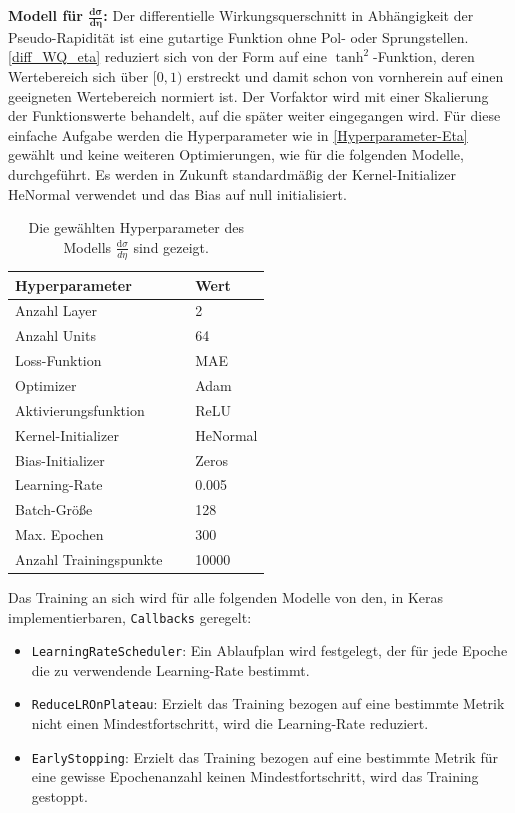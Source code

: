 \textbf{Modell für $\mathbf{\frac{d\sigma}{d\eta}}$:} 
Der differentielle Wirkungsquerschnitt in Abhängigkeit der Pseudo-Rapidität ist eine gutartige Funktion ohne Pol- oder Sprungstellen. \textsf{\autoref{diff_WQ_eta}} reduziert sich von der Form auf eine $\tanh^2$-Funktion, deren Wertebereich sich über $[0,1)$ erstreckt und damit schon von vornherein auf einen geeigneten Wertebereich normiert ist. Der Vorfaktor wird mit einer Skalierung der Funktionswerte behandelt, auf die später weiter eingegangen wird. 
Für diese einfache Aufgabe werden die Hyperparameter wie in \textsf{\autoref{Hyperparameter-Eta}} gewählt und keine weiteren Optimierungen, wie für die folgenden Modelle, durchgeführt. Es werden in Zukunft standardmäßig der Kernel-Initializer {HeNormal} verwendet und das Bias auf null initialisiert.
\begin{table}[hbt]
	\centering
	\caption{Die gewählten Hyperparameter des Modells $\frac{\text{d}\sigma}{d\eta}$ sind gezeigt.}
	\begin{tabular}{ll}
		Hyperparameter & Wert \\
		\hline \hline
		Anzahl Layer & 2 \\
		Anzahl Units & 64 \\
		Loss-Funktion & MAE \\
		Optimizer & Adam \\
		Aktivierungsfunktion & ReLU \\
		Kernel-Initializer & HeNormal \\
		Bias-Initializer & Zeros \\
		Learning-Rate & 0.005 \\
		Batch-Größe & 128 \\
		Max. Epochen & 300 \\
		Anzahl Trainingspunkte $\quad$& 10000\\
		\hline
	\end{tabular}
	\label{Hyperparameter-Eta}
\end{table}
Das Training an sich wird für alle folgenden Modelle von den, in Keras implementierbaren, \texttt{Callbacks} geregelt:
\begin{itemize}
	\setlength\itemsep{0cm}
	\setlength{\parskip}{0cm}
	\item \texttt{LearningRateScheduler}: Ein Ablaufplan wird festgelegt, der für jede Epoche die zu verwendende Learning-Rate bestimmt. 
	\item \texttt{ReduceLROnPlateau}: Erzielt das Training bezogen auf eine bestimmte Metrik nicht einen Mindestfortschritt, wird die Learning-Rate reduziert.
	\item \texttt{EarlyStopping}: Erzielt das Training bezogen auf eine bestimmte Metrik für eine gewisse Epochenanzahl keinen Mindestfortschritt, wird das Training gestoppt.
\end{itemize}
